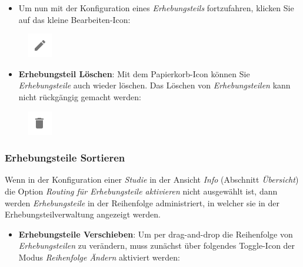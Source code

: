 \documentclass[
  letterpaper,
  DIV=11]{scrreprt}
\providecommand{\tightlist}{%
  \setlength{\itemsep}{0pt}\setlength{\parskip}{0pt}}\usepackage{longtable,booktabs,array}
\begin{document}
\begin{tcolorbox}
\begin{figure}[H]
\end{figure}

\begin{itemize}
\tightlist
\item
  Um nun mit der Konfiguration eines \emph{Erhebungsteils} fortzufahren,
  klicken Sie auf das kleine Bearbeiten-Icon:
\end{itemize}

\begin{figure}[H]

\includegraphics{img/icon-edit.png} \hfill{}

\end{figure}

\begin{itemize}
\tightlist
\item
  \textbf{Erhebungsteil Löschen}: Mit dem Papierkorb-Icon können Sie
  \emph{Erhebungsteile} auch wieder löschen. Das Löschen von
  \emph{Erhebungsteilen} kann nicht rückgängig gemacht werden:
\end{itemize}

\begin{figure}[H]

\includegraphics{img/icon-delete.png} \hfill{}

\end{figure}

\hypertarget{erhebungsteile-sortieren-1}{%
\subsubsection{Erhebungsteile
Sortieren}\label{erhebungsteile-sortieren-1}}

Wenn in der Konfiguration einer \emph{Studie} in der Ansicht \emph{Info}
(Abschnitt \emph{Übersicht}) die Option \emph{Routing für Erhebungsteile
aktivieren} nicht ausgewählt ist, dann werden \emph{Erhebungsteile} in
der Reihenfolge administriert, in welcher sie in der
Erhebungsteilverwaltung angezeigt werden.

\begin{itemize}
\tightlist
\item
  \textbf{Erhebungsteile Verschieben}: Um per drag-and-drop die
  Reihenfolge von \emph{Erhebungsteilen} zu verändern, muss zunächst
  über folgendes Toggle-Icon der Modus \emph{Reihenfolge Ändern}
  aktiviert werden:
\end{itemize}


\end{tcolorbox}
\end{document}
